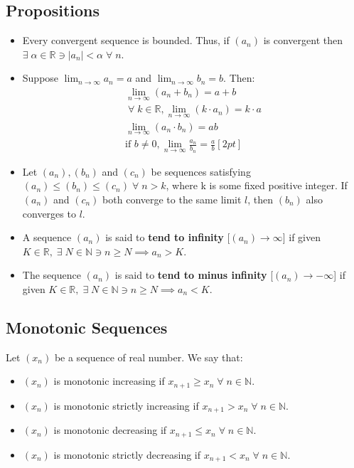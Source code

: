 \documentclass[12pt, a4paper]{article}
\newcommand{\ex}{\; \exists \;}
\newcommand{\real}{\mathbb{R}}
\newcommand{\nat}{\mathbb{N}}
\newcommand{\all}{\; \forall \;}
\begin{document}
\subsection{Propositions}
\begin{itemize}
  \item Every convergent sequence is bounded. Thus, if $(a_n)$ is convergent
    then $\exists \; \alpha \in \real \ni |a_n| < \alpha \all n$.

  \item Suppose $\lim_{n \to \infty} a_n = a$ and $\lim_{n \to \infty}
    b_n = b$. Then:
    \begin{gather*}
      \lim_{n \to \infty} (a_n + b_n) = a + b \\[2pt]
      \all k \in \real, \lim_{n \to \infty} (k \cdot a_n) = k \cdot a \\[2pt]
      \lim_{n \to \infty} (a_n \cdot b_n) = ab \\[2pt]
      \text{if } b \ne 0, \lim_{n \to \infty} \frac{a_n}{b_n} = \frac{a}{b}[2pt]
    \end{gather*}

  \item Let $(a_n), (b_n)$ and $(c_n)$ be sequences satisfying
    $(a_n) \leq (b_n) \leq (c_n) \all n > k$, where k is some fixed 
    positive integer. If $(a_n)$ and $(c_n)$ both converge to the same
    limit $l$, then $(b_n)$ also converges to $l$.

  \item A sequence $(a_n)$ is said to \textbf{tend to infinity} [$(a_n) \to \infty$]
    if given $K \in \real, \ex N \in \nat \ni n \geq N \implies a_n > K$.

  \item The sequence $(a_n)$ is said to \textbf{tend to minus infinity} 
    [$(a_n) \to -\infty$]
    if given $K \in \real, \ex N \in \nat \ni n \geq N \implies a_n < K$.
\end{itemize}

\subsection{Monotonic Sequences}
Let $(x_n)$ be a sequence of real number. We say that:
\begin{itemize}
  \item $(x_n)$ is monotonic increasing if $x_{n+1} \geq x_n \all n \in \nat$.
  \item $(x_n)$ is monotonic strictly increasing if 
    $x_{n+1} > x_n \all n \in \nat$.
  \item $(x_n)$ is monotonic decreasing if $x_{n+1} \leq x_n \all n \in \nat$.
  \item $(x_n)$ is monotonic strictly decreasing if $x_{n+1} < x_n \all n \in \nat$.
\end{itemize}
\end{document}
